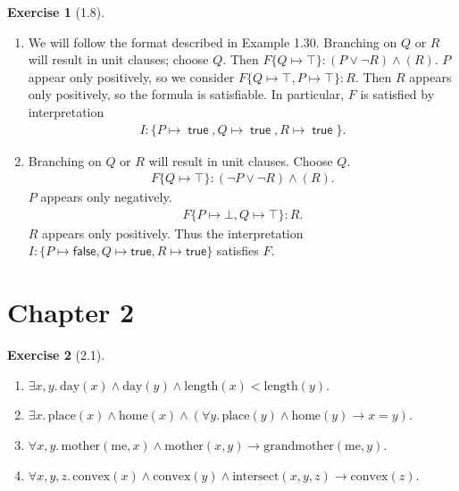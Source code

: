 \documentclass[12pt, psamsfonts]{amsart}
\theoremstyle{definition}
\newtheorem*{exer}{Exercise}
\theoremstyle{remark}
\DeclareMathOperator{\true}{\textsf{true}}
\numberwithin{equation}{subsection}
\begin{document}
\begin{exer}[1.8]
    $ $
    \begin{enumerate}[label=(\alph*)]
        \item
            We will follow the format described in Example 1.30.
            Branching on $Q$ or $R$ will result in unit clauses; choose $Q$.
            Then $F\{ Q \mapsto \top \}: (P \lor \neg R) \land (R)$.
            $P$ appear only positively, so we consider $F\{ Q \mapsto \top, P \mapsto \top \}: R$.
            Then $R$ appears only positively, so the formula is satisfiable.
            In particular, $F$ is satisfied by interpretation
            \begin{align*}
                I: \{ P \mapsto \true, Q \mapsto \true, R \mapsto \true \}.
            \end{align*}
        \item
            Branching on $Q$ or $R$ will result in unit clauses.
            Choose $Q$.
            \begin{align*}
                F\{ Q \mapsto \top \}: (\neg P \lor \neg R) \land (R).
            \end{align*}
            $P$ appears only negatively.
            \begin{align*}
                F\{ P \mapsto \bot, Q \mapsto \top \}: R.
            \end{align*}
            $R$ appears only positively.
            Thus the interpretation $I: \{ P \mapsto \textsf{false}, Q \mapsto \textsf{true}, R \mapsto \textsf{true} \}$ satisfies $F$.
    \end{enumerate}
\end{exer}

\section{Chapter 2}

\begin{exer}[2.1]
    $ $
    \begin{enumerate}[label=(\alph*)]
        \item
            $\exists x, y.\, \text{day}(x) \land \text{day}(y) \land \text{length}(x) < \text{length}(y)$.
        \item
            $\exists x.\, \text{place}(x) \land \text{home}(x) \land (\forall y.\, \text{place}(y) \land \text{home}(y) \rightarrow x = y)$.
        \item
            $\forall x, y.\, \text{mother}(\text{me}, x) \land \text{mother}(x, y) \rightarrow \text{grandmother}(\text{me}, y)$.
        \item
            $\forall x, y, z.\, \text{convex}(x) \land \text{convex}(y) \land \text{intersect}(x, y, z) \rightarrow \text{convex}(z)$.
    \end{enumerate}
\end{exer}
\end{document}
